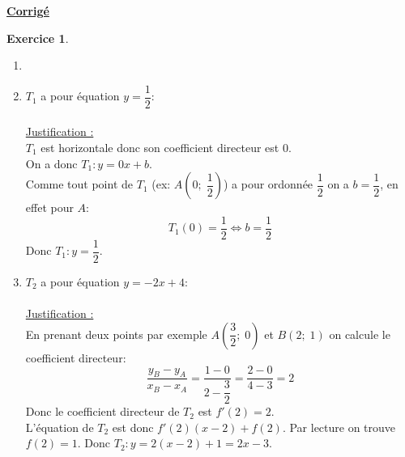 \documentclass{exam}
\theoremstyle{definition}
\newtheorem{exercice}{Exercice}
\begin{document}
    
\newpage

\begin{center}
    \LARGE
    \textbf{\underline{Corrigé}}
\end{center}
\setcounter{exercice}{0}

\begin{exercice}
    \begin{enumerate}
        \item[]
        \item $T_1$ a pour équation $y = \dfrac{1}{2}$:\\
        \\
        \underline{Justification :}\\
        $T_1$ est horizontale donc son coefficient directeur est $0$.\\
        On a donc $T_1: y = 0x + b$.\\
        Comme tout point de $T_1$ (ex: $A\left(0;\; \dfrac{1}{2}\right)$) a pour ordonnée $\dfrac{1}{2}$ on a $b = \dfrac{1}{2}$, en effet pour $A$:
        $$
            T_1(0) = \dfrac{1}{2} \iff b = \dfrac{1}{2}
        $$
        Donc $T_1: y = \dfrac{1}{2}$.
        \item $T_2$ a pour équation $y = -2x + 4$:\\
        \\
        \underline{Justification :}\\
        En prenant deux points par exemple $A\left(\dfrac{3}{2};\; 0\right)$ et $B\left(2;\; 1\right)$ on calcule le coefficient directeur:
        $$
            \frac{y_B - y_A}{x_B - x_A} = \dfrac{1 - 0}{2 - \dfrac{3}{2}} = \dfrac{2 - 0}{4 - 3} = 2
        $$
        Donc le coefficient directeur de $T_2$ est $f'(2) = 2$.\\
        L'équation de $T_2$ est donc $f'(2)(x-2) + f(2)$. Par lecture on trouve $f(2) = 1$.
        Donc $T_2: y = 2(x-2) + 1 = 2x -3$.
    \end{enumerate}
\end{exercice}
\end{document}
